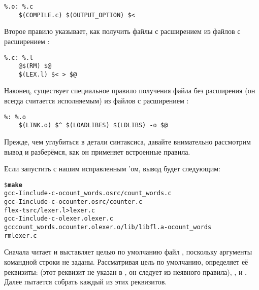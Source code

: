{\footnotesize
\begin{verbatim}
%.o: %.c
    $(COMPILE.c) $(OUTPUT_OPTION) $<
\end{verbatim}
}

Второе правило указывает, как получить файлы с расширением
 из файлов с расширением :

{\footnotesize
\begin{verbatim}
%.c: %.l
    @$(RM) $@
    $(LEX.l) $< > $@
\end{verbatim}
}

Наконец, существует специальное правило получения файла без расширения
(он всегда считается исполняемым) из файлов с расширением
:

{\footnotesize
\begin{verbatim}
%: %.o
    $(LINK.o) $^ $(LOADLIBES) $(LDLIBS) -o $@
\end{verbatim}
}

Прежде, чем углубиться в детали синтаксиса, давайте внимательно
рассмотрим вывод \GNUmake{} и разберёмся, как он применяет встроенные
правила.

Если запустить \GNUmake{} с нашим исправленным \Makefile{}'ом, вывод
будет следующим:

{\footnotesize
\begin{alltt}
\$ \textbf{make}
gcc  -I include  -c -o count\_words.o src/count\_words.c
gcc  -I include  -c -o counter.o src/counter.c
flex  -t src/lexer.l > lexer.c
gcc  -I include  -c -o lexer.o lexer.c
gcc   count\_words.o counter.o lexer.o /lib/libfl.a -o count\_words
rm lexer.c
\end{alltt}
}

Сначала \GNUmake{} читает \Makefile{} и выставляет целью по умолчанию
файл , поскольку аргументы командной строки не
заданы. Рассматривая цель по умолчанию, \GNUmake{} определяет
её реквизиты:  (этот реквизит не указан в
\Makefile{}, он следует из неявного правила), ,
 и . Далее \GNUmake{} пытается
собрать каждый из этих реквизитов.

